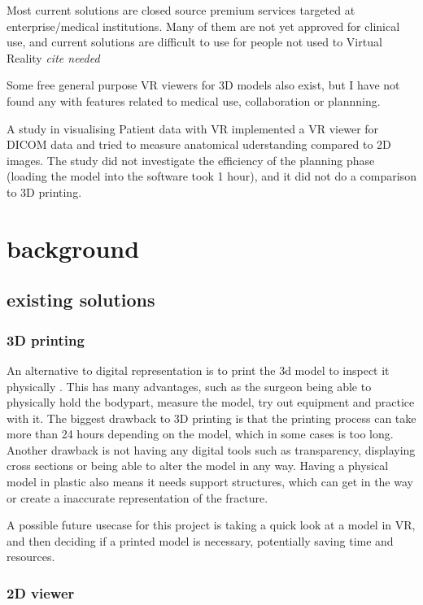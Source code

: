 \documentclass[11pt]{scrartcl}
\begin{document}
Most current solutions are closed source premium services targeted at enterprise/medical institutions. Many of them are not yet approved for clinical use, and current solutions are difficult to use for people not used to Virtual Reality \emph{cite needed}


Some free general purpose VR viewers for 3D models also exist, but I have not found any with features related to medical use, collaboration or plannning.

A study in visualising Patient data with VR \cite{vertemati_virtual_2019} implemented a VR viewer for DICOM data and tried to measure anatomical uderstanding compared to 2D images. The study did not investigate the efficiency of the planning phase (loading the model into the software took 1 hour), and it did not do a comparison to 3D printing.

\section{ background }

\subsection{ existing solutions}


\subsubsection { 3D printing }

An alternative to digital representation is to print the 3d model to inspect it physically \cite{mishra_virtual_2019}. This has many advantages, such as the surgeon being able to physically hold the bodypart, measure the model, try out equipment and practice with it.
The biggest drawback to 3D printing is that the printing process can take more than 24 hours depending on the model, which in some cases is too long. Another drawback is not having any digital tools such as transparency, displaying cross sections or being able to alter the model in any way. Having a physical model in plastic also means it needs support structures, which can get in the way or create a inaccurate representation of the fracture.

A possible future usecase for this project is taking a quick look at a model in VR, and then deciding if a printed model is necessary, potentially saving time and resources.

\subsubsection {2D viewer}
\end{document}
